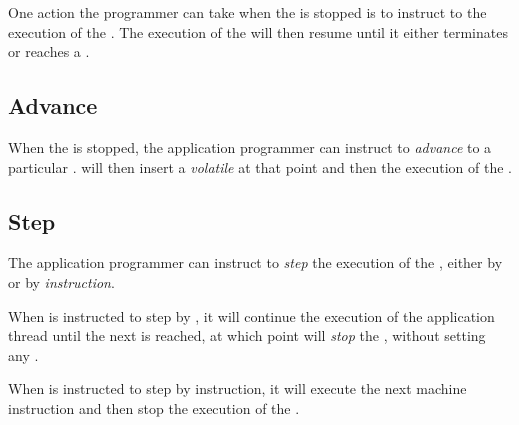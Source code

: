 One action the programmer can take when the \applicationthread{} is
stopped is to instruct \sysname{} to \emph{\continue{}} the execution
of the \applicationthread{}.  The execution of the
\applicationthread{} will then resume until it either terminates or
reaches a \breakpoint{}.

%
\def\Dvance{Advance}%
\def\dvance{advance}%
\def\dvances{advances}%
\subsection{\Dvance{}}

When the \applicationthread{} is stopped, the application programmer
can instruct \sysname{} to \emph{\dvance{}} to a particular
\pollpoint{}.  \sysname{} will then insert a \emph{volatile
  \breakpoint{}} at that point and then \continue{} the execution of
the \applicationthread{}.

%
\def\Step{Step}%
\def\step{step}%
\def\steps{steps}%
\subsection{\Step{}}

The application programmer can instruct \sysname{} to \emph{\step{}}
the execution of the \applicationthread{}, either by \emph{\pollpoint}
or by \emph{instruction}.  

When \sysname{} is instructed to \step{} by \pollpoint{}, it will
continue the execution of the application thread until the next
\pollpoint{} is reached, at which point \sysname{} will \emph{stop}
the \applicationthread{}, without setting any \breakpoint{}. 

When \sysname{} is instructed to \step{} by instruction, it will
execute the next machine instruction and then stop the execution of
the \applicationthread{}.
